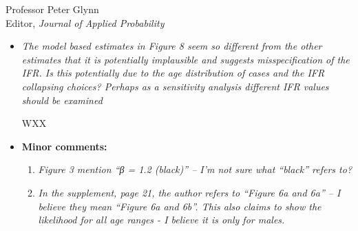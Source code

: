 \documentclass[11pt]{letter} %
\begin{document}
\begin{letter}{Professor
	Peter Glynn\\
	Editor, {\em Journal of Applied Probability}}
\begin{itemize}
\vspace{5mm}
WXX
\vspace{5mm}
\item {\it The model based estimates in Figure 8 seem so different from the other estimates that it is potentially implausible and suggests misspecification of the IFR. Is this potentially due to the age distribution of cases and the IFR collapsing choices? Perhaps as a sensitivity analysis different IFR values should be examined}

\vspace{5mm}
WXX
\vspace{5mm}
\item {\bf Minor comments:}
	\begin{enumerate}
		\item {\it Figure 3 mention “β = 1.2 (black)” – I’m not sure what “black” refers to?}
		\item {\it In the supplement, page 21, the author refers to “Figure 6a and 6a” – I believe they mean “Figure 6a and 6b”. This also claims to show the likelihood for all age ranges - I believe it is only for males.}
	\end{enumerate}
\end{itemize}

\end{letter}
\end{document}
